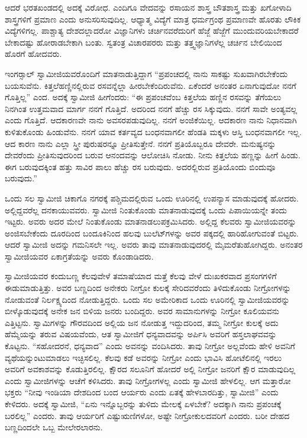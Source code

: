  ಆದರೆ ಭರತಖಂಡದಲ್ಲಿ ಅದಕ್ಕೆ ವಿರೋಧ. ಎಂದಿಗೂ ವೇದವನ್ನು ರಸಾಯನ ಶಾಸ್ತ್ರ ಬೌತಶಾಸ್ತ್ರ ಮತ್ತು ಖಗೋಳಾದಿ ಶಾಸ್ತ್ರಗಳಿಗೆ ಪ್ರಮಾಣ ಎಂದು ಅನುಸರಿಸುವುದಿಲ್ಲ. ಆಧ್ಯಾತ್ಮ ವಿದ್ಯೆಗೆ ಮಾತ್ರ ಧರ್ಮಗ್ರಂಥ ಪ್ರಮಾಣವೇ ಹೊರತು ಲೌಕಿಕ ವಿದ್ಯೆಗಳಿಗಲ್ಲ. ಪಾಶ್ಚಾತ್ಯ ದೇಶದಲ್ಲಾದರೋ ವಿಜ್ಞಾನಿಗಳು ಚರ್ಚಿನವರೆದುರಿಗೆ ಹೆಜ್ಜೆ ಹೆಜ್ಜೆಗೆ ಮುಂದುವರಿಯಬೇಕಾದರೆ ಬೇಕಾದಷ್ಟು ಹೋರಾಡಬೇಕಾಗಿ ಬಂತು. ಸ್ವತಂತ್ರ ವಿಚಾರಪರರು ಮತ್ತು ತತ್ತ್ವಜ್ಞಾನಿಗಳೆಲ್ಲ ಚರ್ಚಿನ ಬೇಲಿಯಿಂದ ಹೊರಗೆ ಹೋದವರು. 

 ಇಂಗರ್‍ಸಾಲ್ ಸ್ವಾಮೀಜಿಯವರೊಂದಿಗೆ ಮಾತನಾಡುತ್ತಿದ್ದಾಗ “ಪ್ರಪಂಚದಲ್ಲಿ ನಾನು ಸಾಕಷ್ಟು ಸುಖವಾಗಿರಬೇಕೆಂದು ಬಯಸುವೆನು. ಕಿತ್ತಲೆಹಣ್ಣಿನಲ್ಲಿರುವ ರಸವನ್ನೆಲ್ಲಾ ಹೀರಬೇಕೆಂದಿರುವೆನು. ಏಕೆಂದರೆ ಅನಂತರ ಏನಾಗುವುದೋ ನನಗೆ ಗೊತ್ತಿಲ್ಲ” ಎಂದ. ಅದಕ್ಕೆ ಸ್ವಾಮೀಜಿ ಹೀಗೆಂದರು: “ಈ ಪ್ರಪಂಚವೆಂಬ ಕಿತ್ತಲೆಯ ಹಣ್ಣಿನ ರಸವನ್ನು ತೆಗೆಯಲು ನಿನಗಿಂತ ಉತ್ತಮವಾದ ಮಾರ್ಗ ನನಗೆ ಗೊತ್ತಿದೆ. ಅದರಿಂದ ನನಗೆ ಹೆಚ್ಚು ರಸ ಸಿಕ್ಕುವುದು. ನನಗೆ ಸಾವೇ ಅಂತ್ಯವಲ್ಲ ಎಂದು ಗೊತ್ತಿದೆ. ಆದಕಾರಣವೇ ನಾನು ಅವಸರಪಡುವುದಿಲ್ಲ. ನನಗೆ ಅಂಜಿಕೆಯಿಲ್ಲ. ಆದಕಾರಣ ನಾನು ನಿಧಾನವಾಗಿ ಕುಳಿತುಕೊಂಡು ಹಿಂಡುವೆನು. ನನಗೆ ಯಾವ ಕರ್ತವ್ಯದ ಬಂಧನವಾಗಲೀ ಹೆಂಡತಿ ಮಕ್ಕಳು ಆಸ್ತಿ ಬಂಧನವಾಗಲೀ ಇಲ್ಲ. ಆದ ಕಾರಣ ನಾನು ಎಲ್ಲಾ ಸ್ತ್ರೀ ಪುರುಷರನ್ನೂ ಪ್ರೀತಿಸುತ್ತೇನೆ. ನನಗೆ ಪ್ರತಿಯೊಬ್ಬರೂ ದೇವರೇ. ಮನುಷ್ಯನನ್ನು ದೇವರೆಂದು ಪ್ರೀತಿಸುವುದರಿಂದ ಬರುವ ಆನಂದವನ್ನು ಆಲೋಚಿಸಿ ನೋಡು. ನೀನು ಕಿತ್ತಲೆಯ ಹಣ್ಣನ್ನು ಹೀಗೆ ಹಿಂಡು. ಈಗ ಬರುವುದಕ್ಕಿಂತ ಹತ್ತು ಸಾವಿರ ಪಾಲು ಹೆಚ್ಚು ರಸ ಬರುವುದು. ಅದರಲ್ಲಿರುವ ಪ್ರತಿಯೊಂದು ಬಿಂದುವೂ ಬರುವುದು.” 

\vskip 2pt

 ಒಂದು ಸಲ ಸ್ವಾಮೀಜಿ ಚಿಕಾಗೊ ನಗರಕ್ಕೆ ಪಶ್ಚಿಮದಲ್ಲಿರುವ ಒಂದು ಊರಿನಲ್ಲಿ ಉಪನ್ಯಾಸ ಮಾಡುವುದಕ್ಕೆ ಹೋದರು. ಅಲ್ಲಿದ್ದವರೆಲ್ಲ ದನಕಾಯುವವರು. ಸ್ವಾಮೀಜಿ ನಿಂತುಕೊಂಡು ಮಾತನಾಡುವುದಕ್ಕೆ ಒಂದು ಪಿಪಾಯಿಯನ್ನೇ ತಂದು ಇಟ್ಟರು. ಅವರು ಅದರ ಮೇಲೆ ನಿಂತುಕೊಂಡು ಮಾತನಾಡಲುಪಕ್ರಮಿಸಿದರು. ಅಲ್ಲಿದ್ದ ಕೆಲವರು ಸ್ವಾಮೀಜಿಯವರನ್ನು ಅಂಜಿಸಬೇಕೆಂದು ದೂರದಿಂದ ಬಂದೂಕಿನಿಂದ ಹಲವು ಬುಲೆಟ್‍ಗಳನ್ನು ಅವರ ಪಕ್ಕದಲ್ಲಿ ಹಾರಿಹೋಗುವಂತೆ ಬಿಟ್ಟರು. ಆದರೆ ಸ್ವಾಮೀಜಿ ಅದನ್ನು ಗಮನಿಸಲೇ ಇಲ್ಲ. ಅವರು ತಾವು ಮಾತನಾಡುವುದರಲ್ಲಿ ಮೈಮರೆತುಹೋಗಿದ್ದರು. ಅನಂತರ ಸ್ವಾಮೀಜಿಯವರ ಏಕಾಗ್ರತೆಯನ್ನು ಅವರು ಕೊಂಡಾಡಿದರು. 

\vskip 2pt

 ಸ್ವಾಮೀಜಿಯವರ ಕಂದುಬಣ್ಣ ಕೆಲವುವೇಳೆ ತಮಾಷೆಯಾದ ಮತ್ತೆ ಕೆಲವು ವೇಳೆ ದುಃಖಕರವಾದ ಪ್ರಸಂಗಗಳಿಗೆ ಈಡುಮಾಡುತ್ತಿತ್ತು. ಅವರ ಬಣ್ಣದಿಂದ ಅನೇಕರು ನೀಗ್ರೋ ಕುಲಕ್ಕೆ ಸೇರಿದವರೆಂದು ತಿಳಿದುಕೊಂಡು ನೀಗ್ರೋಗಳನ್ನು ನೋಡುವಂತೆ ನಿರ್ಲಕ್ಷ್ಯದಿಂದ ನೋಡುತ್ತಿದ್ದರು. ಒಂದು ಸಲ ಅಮೇರಿಕಾದ ಒಂದು ಊರಿನಲ್ಲಿ ಸ್ವಾಮೀಜಿಯವರನ್ನು ಬೀಳ್ಕೊಡುವುದಕ್ಕೆ ಅನೇಕ ಜನ ಬಿಳಿಯ ಜನರು ಬಂದಿದ್ದರು. ಅವರ ಸಾಮಾನುಗಳನ್ನು ನೀಗ್ರೋ ಕೂಲಿಯವನು ಎತ್ತಿಟ್ಟನು. ಸ್ವಾಮಿಗಳನ್ನು ಗೌರವದಿಂದ ಅಲ್ಲಿಯ ಜನ ನೋಡುತ್ತ ಇದ್ದುದರಿಂದ, ತಮ್ಮ ನೀಗ್ರೋ ಕುಲಕ್ಕೆ ಅದು ಹೆಮ್ಮೆಯನ್ನು ತರುವ ವಿಷಯವೆಂದು, ಆತ ಸ್ವಾಮೀಜಿಗೆ ಧನ್ಯವಾದವನ್ನು ಅರ್ಪಿಸಿ ಅವರಿಗೆ ಹಸ್ತಲಾಘವವನ್ನು ಕೊಟ್ಟನು. “ಸಹೋದರನೆ, ಧನ್ಯವಾದ” ಎಂದು ಅವನನ್ನು ವಂದಿಸಿದರು. ತಾವು ನೀಗ್ರೋ ಅಲ್ಲವೆಂದು ಹೇಳಿ ಅವನಿಗೆ ವ್ಯಥೆಯನ್ನುಂಟುಮಾಡಲು ಇಚ್ಛಿಸಲಿಲ್ಲ. ಕೆಲವು ಕಡೆ ಅವರನ್ನು ನೀಗ್ರೋ ಎಂದು ಭಾವಿಸಿ ಹೋಟೆಲಿನಲ್ಲಿ ಇರಲು ಅವರಿಗೆ ಅವಕಾಶವನ್ನು ಕೊಡುತ್ತಿರಲಿಲ್ಲ. ಕ್ಷೌರದ ಸಲೂನಿಗೆ ಹೋದರೆ ಅಲ್ಲಿ ನೀಗ್ರೋ‌ ಜನರಿಗೆ ಕ್ಷೌರ ಮಾಡುವುದಿಲ್ಲ ಎಂದು ಸ್ವಾಮೀಜಿಗಳನ್ನು ಆಚೆಗೆ ಕಳಿಸಿದರು. ತಾವು ನೀಗ್ರೋಗಳಲ್ಲ ಎಂದು ಸ್ವಾಮೀಜಿ ಹೇಳಲಿಲ್ಲ. ಆಗ ಮತ್ತಾರೋ ಭಕ್ತರು “ನೀವು ಇಂಡಿಯಾ ದೇಶದಿಂದ ಬಂದ ಆರ್ಯರು ಎಂದು ಏತಕ್ಕೆ ಹೇಳಬಾರದಿತ್ತು, ಸ್ವಾಮೀಜಿ” ಎಂದು ಕೇಳಿದರು. ಅದಕ್ಕೆ ಸ್ವಾಮೀಜಿ,‌‌ “ಏನು ಇನ್ನೊಬ್ಬರನ್ನು ತುಳಿದು ಮೇಲಕ್ಕೆ ಏಳಬೇಕೆ? ಅದಕ್ಕಾಗಿ ನಾನು ಪ್ರಪಂಚಕ್ಕೆ ಬರಲಿಲ್ಲ‌” ಎಂದರು. ತಾವು ಆರ್ಯರಿಗೆ ಎಷ್ಟು\break ಋಣಿಗಳೋ, ಅಷ್ಟೇ ನೀಗ್ರೋಕುಲದವರಿಗೆ ಎಂದರು. ಬರೀ ದೇಹದ ಬಣ್ಣದಿಂದಲೇ ಒಬ್ಬ ಮೇಲೇರಲಾರನು. 

